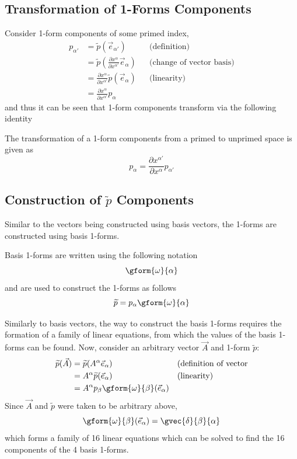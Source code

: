 \subsection{Transformation of 1-Forms Components}
Consider 1-form components of some primed index,
\begin{align*}
    p_{\alpha'} & = \widetilde{p}(\vec{e}_{\alpha'}) && \text{(definition)} \\
    & = \widetilde{p}\left(\frac{\partial x^\alpha}{\partial x^{\alpha'}} \vec{e}_\alpha \right) && \text{(change of vector basis)} \\ 
    & = \frac{\partial x^\alpha}{\partial x^{\alpha'}} \widetilde{p}  (\vec{e}_\alpha) && \text{(linearity)} \\ & = \frac{\partial x^\alpha}{\partial x^{\alpha'}} p_\alpha
\end{align*}
and thus it can be seen that 1-form components transform via the following identity
\begin{definition}
    The transformation of a 1-form components from a primed to unprimed space is given as
    $$ p_{\alpha} = \frac{\partial x^{\alpha'}}{\partial x^\alpha} p_{\alpha'} $$
\end{definition}

\subsection{Construction of $\widetilde{p}$ Components}
Similar to the vectors being constructed using basis vectors, the 1-forms are constructed using basis 1-forms.

\begin{definition}
    Basis 1-forms are written using the following notation
    $$ \gform{\omega}{\alpha} $$
    and are used to construct the 1-forms as follows
    $$ \widetilde{p} = p_\alpha  \gform{\omega}{\alpha} $$
\end{definition}

Similarly to basis vectors, the way to construct the basis 1-forms requires the formation of a family of linear equations, from which the values of the basis 1-forms can be found. 
\newpage
Now, consider an arbitrary vector $\vec{A}$ and 1-form $\widetilde{p}$:
\begin{align*}
        \widetilde{p}(\vec{A}) & = \widetilde{p}(A^\alpha \vec{e}_\alpha) && \text{(definition of vector} \\ 
        & = A^\alpha \widetilde{p}(\vec{e}_\alpha) &&\text{(linearity)} \\
        & = A^\alpha p_\beta \gform{\omega}{\beta} (\vec{e}_\alpha)
\end{align*}
Since $\vec{A}$ and $\widetilde{p}$ were taken to be arbitrary above,
$$ \gform{\omega}{\beta}(\vec{e}_\alpha) = \gvec{\delta}{\beta}{\alpha} $$
which forms a family of 16 linear equations which can be solved to find the 16 components of the 4 basis 1-forms.

